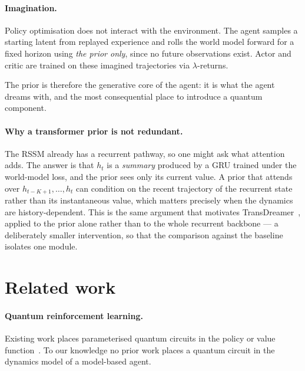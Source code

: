 \documentclass[11pt]{article}
\newif\ifdraft
\newcommand{\pend}[1]{%
  \ifdraft\textcolor{PendFG}{\textbf{[TODO:} \textit{#1}\textbf{]}}\fi}
\begin{document}
\paragraph{Imagination.} Policy optimisation does not interact with the
environment. The agent samples a starting latent from replayed
experience and rolls the world model forward for a fixed horizon using
\emph{the prior only}, since no future observations exist. Actor and
critic are trained on these imagined trajectories via
$\lambda$-returns.

The prior is therefore the generative core of the agent: it is what the
agent dreams with, and the most consequential place to introduce a
quantum component.

\paragraph{Why a transformer prior is not redundant.}
The RSSM already has a recurrent pathway, so one might ask what
attention adds. The answer is that $h_t$ is a \emph{summary} produced by
a GRU trained under the world-model loss, and the prior sees only its
current value. A prior that attends over $h_{t-K+1}, \dots, h_t$ can
condition on the recent trajectory of the recurrent state rather than
its instantaneous value, which matters precisely when the dynamics are
history-dependent. This is the same argument that motivates
TransDreamer~\cite{transdreamer}, applied to the prior alone rather
than to the whole recurrent backbone --- a deliberately smaller
intervention, so that the comparison against the baseline isolates one
module.

\section{Related work}
\paragraph{Quantum reinforcement learning.} Existing work places
parameterised quantum circuits in the policy or value
function~\cite{chen2020,skolik2023}. To our knowledge no prior work
places a quantum circuit in the dynamics model of a model-based agent.
\pend{the systematic novelty search has been completed; record the
search strings, databases and dates in Appendix~\ref{app:novelty}}
\end{document}
